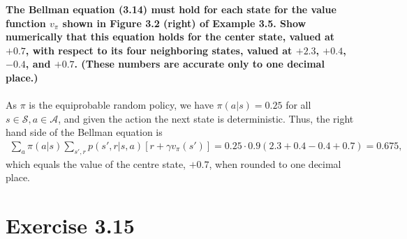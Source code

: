 \documentclass[a4paper,11pt]{article}
\numberwithin{equation}{section}
\theoremstyle{remark}
\begin{document}
\textbf{The Bellman equation (3.14) must hold for each state for the value function $v_\pi$ shown in Figure 3.2 (right) of Example 3.5. Show numerically that this equation holds for the center state, valued at $+0.7$, with respect to its four neighboring states, valued at $+2.3$, $+0.4$, $-0.4$, and $+0.7$. (These numbers are accurate only to one decimal place.) }
\\ \\
As $\pi$ is the equiprobable random policy, we have $\pi(a | s) = 0.25$ for all $s \in \mathcal{S}, a \in \mathcal{A}$, and given the action the next state is deterministic. Thus, the right hand side of the Bellman equation is
\begin{align*}
	\sum_{a}^{} \pi(a | s) \sum_{s', r}^{} p(s', r | s, a)[r + \gamma v_\pi(s')] = 0.25 \cdot 0.9 (2.3 + 0.4 - 0.4 + 0.7) = 0.675,
\end{align*}
which equals the value of the centre state, $+0.7$, when rounded to one decimal place.

\section{Exercise 3.15}
\end{document}
